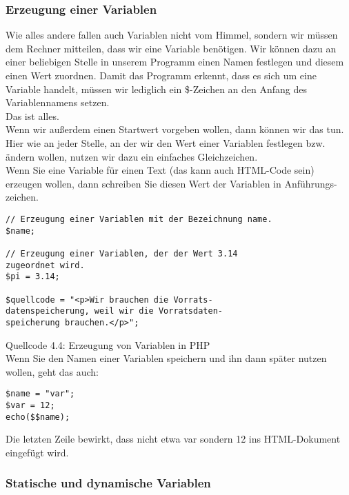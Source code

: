 \subsubsection{Erzeugung einer Variablen}

Wie alles andere fallen auch Variablen nicht vom Himmel, sondern wir müssen dem Rechner mitteilen, dass wir eine Variable benötigen. Wir können dazu an einer beliebigen Stelle in unserem Programm einen Namen festlegen und diesem einen Wert zuordnen. Damit das Programm erkennt, dass es sich um eine Variable handelt, müssen wir lediglich ein \$-Zeichen an den Anfang des Variablennamens setzen. \\

Das ist alles.\\

Wenn wir außerdem einen Startwert vorgeben wollen, dann können wir das tun. Hier wie an jeder Stelle, an der wir den Wert einer Variablen festlegen bzw. ändern wollen, nutzen wir dazu ein einfaches Gleichzeichen.\\

Wenn Sie eine Variable für einen Text (das kann auch HTML-Code sein) erzeugen wollen, dann schreiben Sie diesen \glqq{}Wert\grqq{} der Variablen in Anführungs-zeichen.\\

\begin{verbatim}
// Erzeugung einer Variablen mit der Bezeichnung name.
$name;                         

// Erzeugung einer Variablen, der der Wert 3.14 
zugeordnet wird.
$pi = 3.14;                    

$quellcode = "<p>Wir brauchen die Vorrats- 
datenspeicherung, weil wir die Vorratsdaten-
speicherung brauchen.</p>";
\end{verbatim}Quellcode 4.4: Erzeugung von Variablen in PHP\\

Wenn Sie den Namen einer Variablen speichern und ihn dann später nutzen wollen, geht das auch:

\begin{verbatim}
$name = "var";
$var = 12;
echo($$name);
\end{verbatim}

Die letzten Zeile bewirkt, dass nicht etwa var sondern 12 ins HTML-Dokument eingefügt wird.

\subsubsection{Statische und dynamische Variablen}

